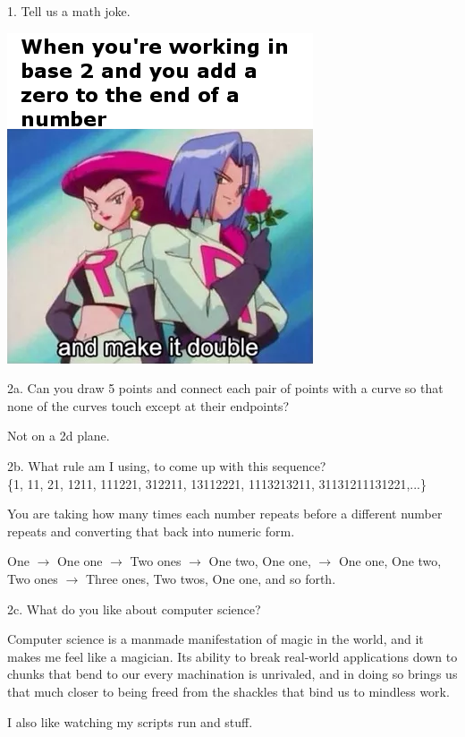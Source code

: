 \documentclass[12pt]{report}
\begin{document}
1. Tell us a math joke.

\includegraphics{math_joke}

\pagebreak

2a. Can you draw 5 points and connect each pair of points with a curve so that none of the curves touch except at their endpoints?


Not on a 2d plane.


2b. What rule am I using, to come up with this sequence? \\
\{1, 11, 21, 1211, 111221, 312211, 13112221, 1113213211, 31131211131221,...\}


You are taking how many times each number repeats before a different number repeats and converting that back into numeric form.


One $\rightarrow$ One one $\rightarrow$ Two ones $\rightarrow$ One two, One one, $\rightarrow$ One one, One two, Two ones $\rightarrow$ Three ones, Two twos, One one, and so forth.

\pagebreak


2c. What do you like about computer science?


Computer science is a manmade manifestation of magic in the world, and it makes me feel like a magician.
Its ability to break real-world applications down to chunks that bend to our every machination is unrivaled,
and in doing so brings us that much closer to being freed from the shackles that bind us to mindless work.

I also like watching my scripts run and stuff.
\end{document}
